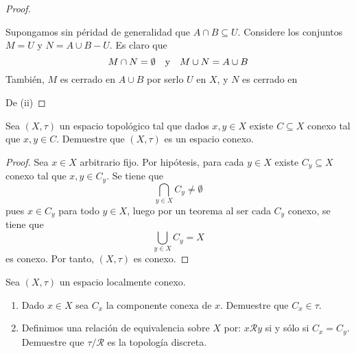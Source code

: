 \documentclass[12pt]{report}
\theoremstyle{largebreak}
\begin{document}
\begin{proof}
\begin{itemize}
            Supongamos sin péridad de generalidad que $A\cap B\subseteq U$. Considere los conjuntos $M=U$ y $N=A\cup B-U$. Es claro que
            \begin{equation*}
                M\cap N=\emptyset\quad\textup{y}\quad M\cup N=A\cup B
            \end{equation*}
            También, $M$ es cerrado en $A\cup B$ por serlo $U$ en $X$, y $N$ es cerrado en 
        \end{itemize}

        De (ii)
    \end{proof}

    \begin{excer}
        Sea $(X,\tau)$ un espacio topológico tal que dados $x,y\in X$ existe $C\subseteq X$ conexo tal que $x,y\in C$. Demuestre que $(X,\tau)$ es un espacio conexo.
    \end{excer}

    \begin{proof}
        Sea $x\in X$ arbitrario fijo. Por hipótesis, para cada $y\in X$ existe $C_y\subseteq X$ conexo tal que $x,y\in C_y$. Se tiene que
        \begin{equation*}
            \bigcap_{ y\in X}C_y\neq\emptyset
        \end{equation*}
        pues $x\in C_y$ para todo $y\in X$, luego por un teorema al ser cada $C_y$ conexo, se tiene que
        \begin{equation*}
            \bigcup_{y\in X}C_y=X
        \end{equation*}
        es conexo. Por tanto, $(X,\tau)$ es conexo.
    \end{proof}

    \begin{excer}
        Sea $(X,\tau)$ un espacio localmente conexo.
        \begin{enumerate}
            \item Dado $x\in X$ sea $C_x$ la componente conexa de $x$. Demuestre que $C_x\in\tau$.
            \item Definimos una relación de equivalencia sobre $X$ por: $x\mathcal{R}y$ si y sólo si $C_x=C_y$. Demuestre que $\tau/\mathcal{R}$ es la topología discreta.
        \end{enumerate}
    \end{excer}
\end{document}
